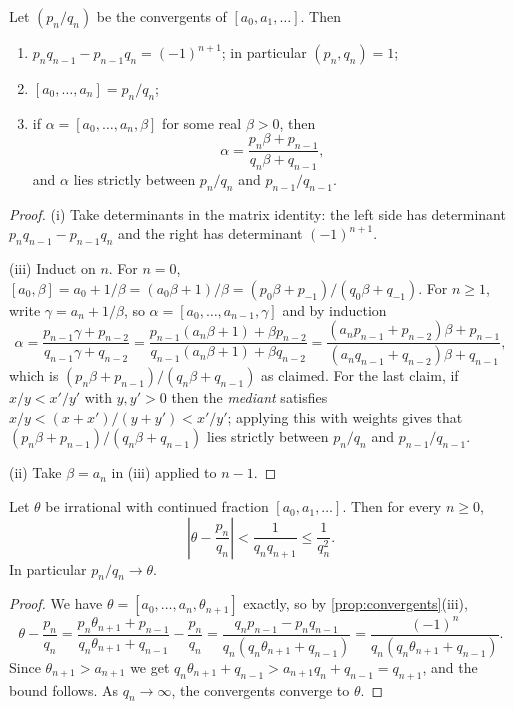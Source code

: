 \documentclass[a4paper]{scrartcl}
\begin{document}
\begin{proposition}\label{prop:convergents}
	Let $(p_n/q_n)$ be the convergents of $[a_0, a_1, \dots]$. Then
	\begin{enumerate}[label=(\roman*)]
		\item $p_nq_{n-1} - p_{n-1}q_n = (-1)^{n+1}$; in particular $(p_n, q_n) = 1$;
		\item $[a_0, \dots, a_n] = p_n/q_n$;
		\item if $\alpha = [a_0, \dots, a_n, \beta]$ for some real $\beta > 0$, then
		$$
		\alpha = \frac{p_n\beta + p_{n-1}}{q_n\beta + q_{n-1}},
		$$
		and $\alpha$ lies strictly between $p_n/q_n$ and $p_{n-1}/q_{n-1}$.
	\end{enumerate}
\end{proposition}
\begin{proof}
	(i) Take determinants in the matrix identity: the left side has determinant $p_nq_{n-1} - p_{n-1}q_n$ and the right has determinant $(-1)^{n+1}$.

	(iii) Induct on $n$. For $n = 0$, $[a_0, \beta] = a_0 + 1/\beta = (a_0\beta + 1)/\beta = (p_0\beta + p_{-1})/(q_0\beta + q_{-1})$. For $n \geq 1$, write $\gamma = a_n + 1/\beta$, so $\alpha = [a_0, \dots, a_{n-1}, \gamma]$ and by induction
	$$
	\alpha = \frac{p_{n-1}\gamma + p_{n-2}}{q_{n-1}\gamma+q_{n-2}} = \frac{p_{n-1}(a_n\beta + 1) + \beta p_{n-2}}{q_{n-1}(a_n\beta+1)+\beta q_{n-2}} = \frac{(a_np_{n-1} + p_{n-2})\beta + p_{n-1}}{(a_nq_{n-1}+q_{n-2})\beta+q_{n-1}},
	$$
	which is $(p_n\beta + p_{n-1})/(q_n\beta+q_{n-1})$ as claimed.
	For the last claim, if $x/y < x'/y'$ with $y, y' > 0$ then the \emph{mediant} satisfies $x/y < (x + x')/(y+y') < x'/y'$; applying this with weights gives that $(p_n\beta + p_{n-1})/(q_n\beta+q_{n-1})$ lies strictly between $p_n/q_n$ and $p_{n-1}/q_{n-1}$.

	(ii) Take $\beta = a_n$ in (iii) applied to $n - 1$.
\end{proof}

\begin{theorem}\label{thm:cfconverge}
	Let $\theta$ be irrational with continued fraction $[a_0, a_1, \dots]$. Then for every $n \geq 0$,
	$$
	\left|\theta - \frac{p_n}{q_n}\right| < \frac1{q_nq_{n+1}} \leq \frac{1}{q_n^2}.
	$$
	In particular $p_n/q_n \to \theta$.
\end{theorem}
\begin{proof}
	We have $\theta = [a_0, \dots, a_n, \theta_{n+1}]$ exactly, so by \autoref{prop:convergents}(iii),
	$$
	\theta - \frac{p_n}{q_n} = \frac{p_n\theta_{n+1}+p_{n-1}}{q_n\theta_{n+1}+q_{n-1}} - \frac{p_n}{q_n} = \frac{q_np_{n-1} - p_nq_{n-1}}{q_n(q_n\theta_{n+1}+q_{n-1})} = \frac{(-1)^{n}}{q_n(q_n\theta_{n+1}+q_{n-1})}.
	$$
	Since $\theta_{n+1} > a_{n+1}$ we get $q_n\theta_{n+1}+q_{n-1} > a_{n+1}q_n + q_{n-1} = q_{n+1}$, and the bound follows. As $q_n \to \infty$, the convergents converge to $\theta$.
\end{proof}
\end{document}
